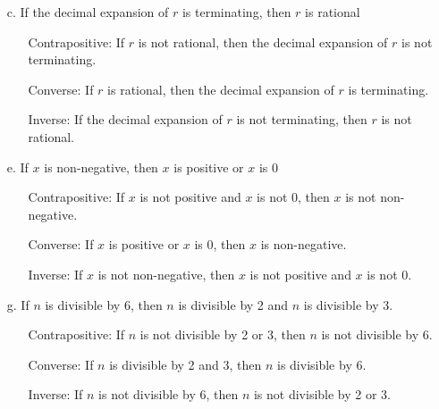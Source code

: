 \documentclass[12pt]{article}
\begin{document}
\begin{enumerate}
\begin{enumerate}
\begin{enumerate}
                    \\
                \end{enumerate}
            \item[c.] If the decimal expansion of $r$ is terminating, then $r$ is rational
                \begin{enumerate}
                    \item[Contrapositive:] If $r$ is not rational, then the decimal expansion of $r$ is not terminating.
                    \item[Converse:] If $r$ is rational, then the decimal expansion of $r$ is terminating.
                    \item[Inverse:] If the decimal expansion of $r$ is not terminating, then $r$ is not rational.
                    \\
                \end{enumerate}
            \item[e.] If $x$ is non-negative, then $x$ is positive or $x$ is 0
                \begin{enumerate}
                    \item[Contrapositive:] If $x$ is not positive and $x$ is not 0, then $x$ is not non-negative.
                    \item[Converse:] If $x$ is positive or $x$ is 0, then $x$ is non-negative.
                    \item[Inverse:]  If $x$ is not non-negative, then $x$ is not positive and $x$ is not 0.
                    \\
                \end{enumerate}
            \item[g.] If $n$ is divisible by 6, then $n$ is divisible by 2 and $n$ is divisible by 3.
                \begin{enumerate}
                    \item[Contrapositive:] If $n$ is not divisible by 2 or $3$, then $n$ is not divisible by 6.
                    \item[Converse:] If $n$ is divisible by 2 and 3, then $n$ is divisible by 6.
                    \item[Inverse:] If $n$ is not divisible by 6, then $n$ is not divisible by 2 or 3. 
                \end{enumerate}
        \end{enumerate}
        \newpage


\end{enumerate}
\end{document}
